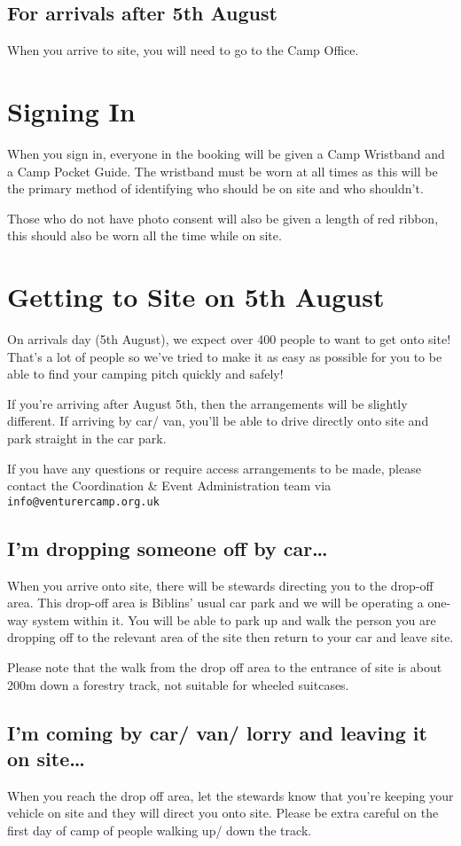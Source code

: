 \documentclass[a4paper, 11pt]{report}
\begin{document}
\subsection{For arrivals after 5th August}
When you arrive to site, you will need to go to the Camp Office.
\section{Signing In}
When you sign in, everyone in the booking will be given a Camp Wristband and a Camp Pocket Guide. The wristband must be worn at all times as this will be the primary method of identifying who should be on site and who shouldn't.\nl

Those who do not have photo consent will also be given a length of red ribbon, this should also be worn all the time while on site. 
\section{Getting to Site on 5th August}
On arrivals day (5th August), we expect over 400 people to want to get onto site! That's a lot of people so we've tried to make it as easy as possible for you to be able to find your camping pitch quickly and safely!\nl

If you're arriving after August 5th, then the arrangements will be slightly different. If arriving by car/ van, you'll be able to drive directly onto site and park straight in the car park.\nl

If you have any questions or require access arrangements to be made, please contact the Coordination \& Event Administration team via \texttt{info@venturercamp.org.uk}

\subsection{I'm dropping someone off by car\ldots}
When you arrive onto site, there will be stewards directing you to the drop-off area. This drop-off area is Biblins' usual car park and we will be operating a one-way system within it. You will be able to park up and walk the person you are dropping off to the relevant area of the site then return to your car and leave site.\nl

Please note that the walk from the drop off area to the entrance of site is about 200m down a forestry track, not suitable for wheeled suitcases.

\subsection{I'm coming by car/ van/ lorry and leaving it on site\ldots}
When you reach the drop off area, let the stewards know that you're keeping your vehicle on site and they will direct you onto site. Please be extra careful on the first day of camp of people walking up/ down the track.\nl
\end{document}
